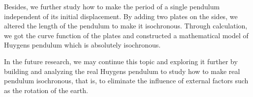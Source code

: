 \documentclass[12pt]{report}
\begin{document}
Besides, we further study how to make the period of a single pendulum independent of its initial displacement. By adding two plates on the sides, we altered the length of the pendulum to make it isochronous. Through calculation, we got the curve function of the plates and constructed a mathematical model of Huygens pendulum which is absolutely isochronous.

In the future research, we may continue this topic and exploring it further by building and analyzing the real Huygens pendulum to study how to make real pendulum isochronous, that is, to eliminate the influence of external factors such as the rotation of the earth.
\renewcommand\bibname{References}
\printbibliography
\end{document}
